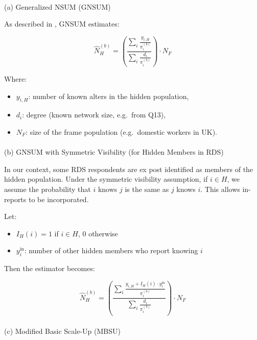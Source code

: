 \documentclass[
  12pt,
  letterpaper,
  DIV=11,
  numbers=noendperiod]{scrartcl}
\makeatletter
\let\oldparagraph\paragraph
\renewcommand{\paragraph}{
    \@ifstar
      \xxxParagraphStar
      \xxxParagraphNoStar
  }
\newcommand{\xxxParagraphStar}[1]{\oldparagraph*{#1}\mbox{}}
\newcommand{\xxxParagraphNoStar}[1]{\oldparagraph{#1}\mbox{}}
\theoremstyle{plain}
\theoremstyle{definition}
\makeatother
\begin{document}
\paragraph{(a) Generalized NSUM (GNSUM)}\label{a-generalized-nsum-gnsum}

As described in \textcite{feeh16-generalizing}, GNSUM estimates:

\[\hat{N}_H^{(b)} = \left( \frac{\sum_{i} \frac{y_{i,H}}{\pi_i^{(b)}}}{\sum_{i} \frac{d_i}{\pi_i^{(b)}}} \right) \cdot N_F\]

Where:

\begin{itemize}
\item
  \(y_{i,H}\): number of known alters in the hidden population,
\item
  \(d_i\): degree (known network size, e.g.~from Q13),
\item
  \(N_F\): size of the frame population (e.g.~domestic workers in UK).
\end{itemize}

\paragraph{(b) GNSUM with Symmetric Visibility (for Hidden Members in
RDS)}\label{b-gnsum-with-symmetric-visibility-for-hidden-members-in-rds}

In our context, some RDS respondents are ex post identified as members
of the hidden population. Under the symmetric visibility assumption, if
\(i \in H\), we assume the probability that \(i\) knows \(j\) is the
same as \(j\) knows \(i\). This allows in-reports to be incorporated.

Let:

\begin{itemize}
\item
  \(I_H(i) = 1\) if \(i \in H\), 0 otherwise
\item
  \(y_{i}^{\text{in}}\): number of other hidden members who report
  knowing \(i\)
\end{itemize}

Then the estimator becomes:

\[\hat{N}_H^{(b)} = \left( \frac{\sum_{i} \frac{y_{i,H} + I_H(i) \cdot y_{i}^{\text{in}}}{\pi_i^{(b)}}}{\sum_{i} \frac{d_i}{\pi_i^{(b)}}} \right) \cdot N_F\]

\paragraph{(c) Modified Basic Scale-Up
(MBSU)}\label{c-modified-basic-scale-up-mbsu}
\end{document}
